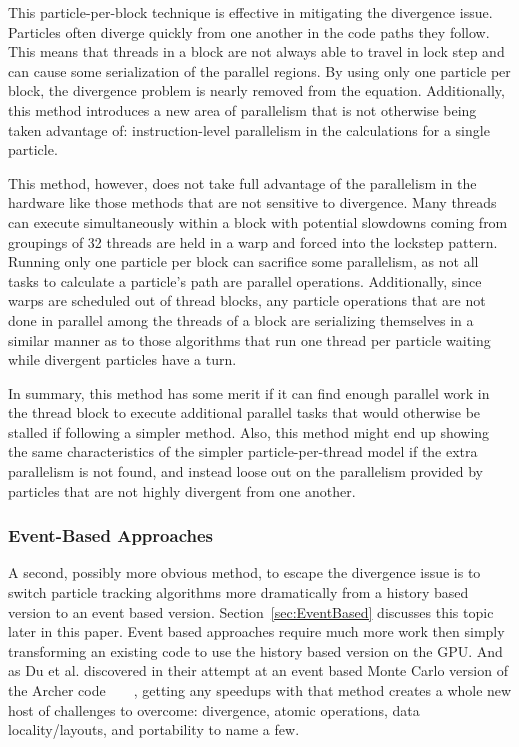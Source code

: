This particle-per-block technique is effective in mitigating the divergence issue.
%
Particles often diverge quickly from one another in the code paths they follow.
%
This means that threads in a block are not always able to travel in lock step and can cause some serialization of the parallel regions.
%
By using only one particle per block, the divergence problem is nearly removed from the equation.
%
Additionally, this method introduces a new area of parallelism that is not otherwise being taken advantage of: instruction-level parallelism in the calculations for a single particle.
%

%
This method, however, does not take full advantage of the parallelism in the hardware like those methods that are not sensitive to divergence.
%
Many threads can execute simultaneously within a block with potential slowdowns coming from groupings of 32 threads are held in a warp and forced into the lockstep pattern.
%
Running only one particle per block can sacrifice some parallelism, as not all tasks to calculate a particle's path are parallel operations.
%
Additionally, since warps are scheduled out of thread blocks, any particle operations that are not done in parallel among the threads of a block are serializing themselves in a similar manner as to those algorithms that run one thread per particle waiting while divergent particles have a turn.
%

In summary, this method has some merit if it can find enough parallel work in the thread block to execute additional parallel tasks that would otherwise be stalled if following a simpler method.
%
Also, this method might end up showing the same characteristics of the simpler particle-per-thread model if the extra parallelism is not found, and instead loose out on the parallelism provided by particles that are not highly divergent from one another. 

\subsubsection*{\textbf{Event-Based Approaches}}

A second, possibly more obvious method, to escape the divergence issue is to switch particle tracking algorithms more dramatically from a history based version to an event based version.
%
Section~\ref{sec:EventBased} discusses this topic later in this paper.
%
Event based approaches require much more work then simply transforming an existing code to use the history based version on the GPU.
%
And as Du et al. discovered in their attempt at an event based Monte Carlo version of the Archer code~\cite{xu2015archer}~\cite{du2013evaluation}~\cite{liu2015comparison}~\cite{su2013monte},  getting any speedups with that method creates a whole new host of challenges to overcome: divergence, atomic operations, data locality/layouts, and portability to name a few.

